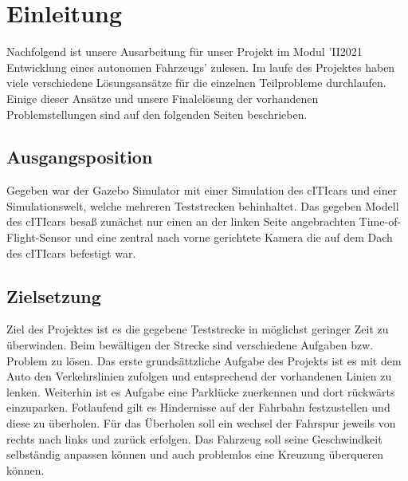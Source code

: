 \section{Einleitung}

Nachfolgend ist unsere Ausarbeitung für unser Projekt im Modul  'II2021 Entwicklung eines autonomen Fahrzeugs' zulesen. Im laufe des Projektes haben viele verschiedene Lösungsansätze für die einzelnen Teilprobleme durchlaufen. Einige dieser Ansätze und unsere Finalelösung der vorhandenen Problemstellungen sind auf den folgenden Seiten beschrieben.

\subsection{Ausgangsposition}
    
Gegeben war der Gazebo Simulator mit einer Simulation des cITIcars und einer Simulationswelt, welche mehreren Teststrecken behinhaltet. Das gegeben Modell des cITIcars besaß zunächst nur einen an der linken Seite angebrachten Time-of-Flight-Sensor und eine zentral nach vorne gerichtete Kamera die auf dem Dach des cITIcars befestigt war.

\subsection{Zielsetzung}

Ziel des Projektes ist es die gegebene Teststrecke in möglichst geringer Zeit zu überwinden. Beim bewältigen der Strecke sind verschiedene Aufgaben bzw. Problem zu lösen. Das erste grundsättzliche Aufgabe des Projekts ist es mit dem Auto den Verkehrslinien zufolgen und entsprechend der vorhandenen Linien   zu lenken. Weiterhin ist es Aufgabe eine Parklücke zuerkennen und dort rückwärts einzuparken. Fotlaufend gilt es Hindernisse auf der Fahrbahn festzustellen und diese zu überholen. Für das Überholen soll ein wechsel der Fahrspur jeweils von rechts nach links und zurück erfolgen. Das Fahrzeug soll seine Geschwindkeit selbständig anpassen können und auch problemlos eine Kreuzung überqueren können. 
